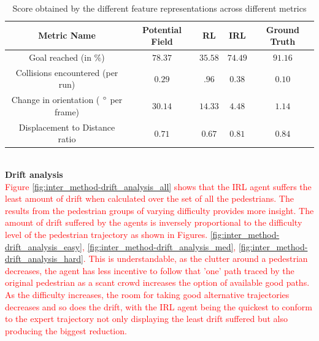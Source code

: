 \begin{table}[htbp]
	\begin{center}
		\renewcommand{\arraystretch}{1.3}
		\begin{tabular}{|c|c|c|c|c|}
			\hline
			Metric Name & Potential Field & RL & IRL  &  Ground Truth \\
			\hline
			Goal reached (in $\%$) & $78.37$ & $35.58$ & $74.49$ & $91.16$\\
			Collisions encountered (per run) & $0.29$ & $.96$ & $0.38$ & $0.10$\\
			Change in orientation ( $\degree$ per frame) & $30.14$ & $14.33$ &  $4.48$ & $1.14$ \\
			Displacement to Distance ratio & $0.71$ & $0.67$ & $0.81$ & $0.84$ \\
			\hline
		\end{tabular}
	\end{center}
	\caption{Score obtained by the different feature representations across different metrics}
	\label{tab:inter_method_numerical_results}
\end{table}\\
\textbf{Drift analysis}\\
\textcolor{red}{Figure \ref{fig:inter_method-drift_analysis_all} shows that the IRL agent suffers the least amount of drift when calculated over the set of all the pedestrians. The results from the pedestrian groups of varying difficulty provides more insight. The amount of drift suffered by the agents is inversely proportional to the difficulty level of the pedestrian trajectory as shown in Figures. \ref{fig:inter_method-drift_analysis_easy}, \ref{fig:inter_method-drift_analysis_med}, \ref{fig:inter_method-drift_analysis_hard}. This is understandable, as the clutter around a pedestrian decreases, the agent has less incentive to follow that 'one' path traced by the original pedestrian as a scant crowd increases the option of available good paths. As the difficulty increases, the room for taking good alternative trajectories decreases and so does the drift, with the IRL agent being the quickest to conform to the expert trajectory not only displaying the least drift suffered but also producing the biggest reduction.}\\
\vspace{5cm}
%
